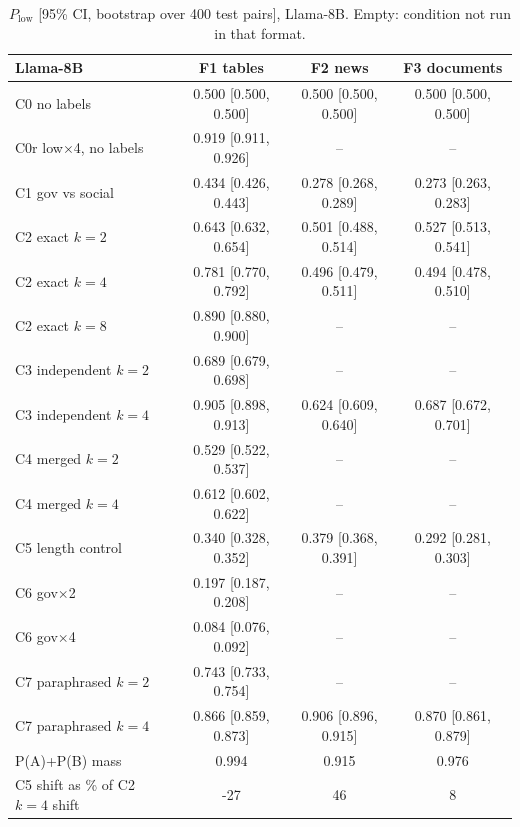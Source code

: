 \scriptsize
\begin{table}[!htbp]\centering\scriptsize\setlength{\tabcolsep}{4pt}\begin{tabular}{@{}lccc@{}}\toprule
Llama-8B & F1 tables & F2 news & F3 documents \\ \midrule
C0 no labels & 0.500 [0.500, 0.500] & 0.500 [0.500, 0.500] & 0.500 [0.500, 0.500] \\
C0r low$\times$4, no labels & 0.919 [0.911, 0.926] & -- & -- \\
C1 gov vs social & 0.434 [0.426, 0.443] & 0.278 [0.268, 0.289] & 0.273 [0.263, 0.283] \\
C2 exact $k{=}2$ & 0.643 [0.632, 0.654] & 0.501 [0.488, 0.514] & 0.527 [0.513, 0.541] \\
C2 exact $k{=}4$ & 0.781 [0.770, 0.792] & 0.496 [0.479, 0.511] & 0.494 [0.478, 0.510] \\
C2 exact $k{=}8$ & 0.890 [0.880, 0.900] & -- & -- \\
C3 independent $k{=}2$ & 0.689 [0.679, 0.698] & -- & -- \\
C3 independent $k{=}4$ & 0.905 [0.898, 0.913] & 0.624 [0.609, 0.640] & 0.687 [0.672, 0.701] \\
C4 merged $k{=}2$ & 0.529 [0.522, 0.537] & -- & -- \\
C4 merged $k{=}4$ & 0.612 [0.602, 0.622] & -- & -- \\
C5 length control & 0.340 [0.328, 0.352] & 0.379 [0.368, 0.391] & 0.292 [0.281, 0.303] \\
C6 gov$\times$2 & 0.197 [0.187, 0.208] & -- & -- \\
C6 gov$\times$4 & 0.084 [0.076, 0.092] & -- & -- \\
C7 paraphrased $k{=}2$ & 0.743 [0.733, 0.754] & -- & -- \\
C7 paraphrased $k{=}4$ & 0.866 [0.859, 0.873] & 0.906 [0.896, 0.915] & 0.870 [0.861, 0.879] \\
\midrule P(A)+P(B) mass & 0.994 & 0.915 & 0.976 \\
C5 shift as \% of C2 $k{=}4$ shift & -27 & 46 & 8 \\
\bottomrule\end{tabular}\caption{$P_{\text{low}}$ [95\% CI, bootstrap over 400 test pairs], Llama-8B. Empty: condition not run in that format.}\end{table}

